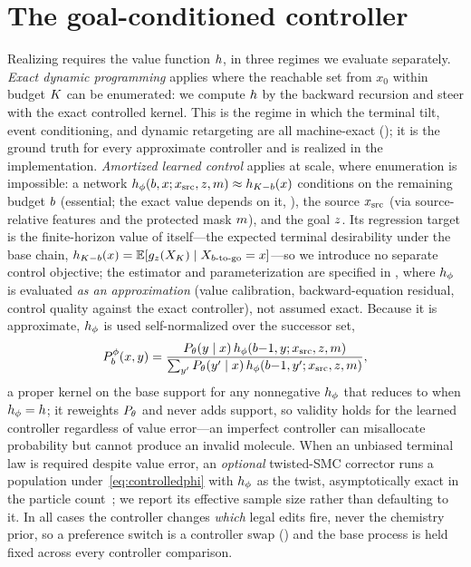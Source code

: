 \section{The goal-conditioned controller}
\label{sec:controller}

Realizing  requires the value function $h$, in three regimes we evaluate separately.
\emph{Exact dynamic programming} applies where the reachable set from $x_0$ within budget $K$ can
be enumerated: we compute $h$ by the backward recursion and steer with the exact controlled kernel.
This is the regime in which the terminal tilt, event conditioning, and dynamic retargeting are all
machine-exact (); it is the ground truth for every approximate controller and is
realized in the implementation. \emph{Amortized learned control} applies at scale, where enumeration is
impossible: a network $h_\phi(b,x;x_{\mathrm{src}},z,m)\approx h_{K-b}(x)$
conditions on the remaining budget $b$ (essential; the exact value depends on it,
), the source $x_{\mathrm{src}}$ (via source-relative features and the protected mask $m$),
and the goal $z$. Its regression target is the finite-horizon value of  itself---the
expected terminal desirability under the base chain,
$h_{K-b}(x)=\mathbb{E}[g_z(X_K)\mid X_{b\text{-to-go}}=x]$---so we
introduce no separate control objective; the estimator and parameterization are specified in
, where $h_\phi$ is evaluated \emph{as an approximation} (value calibration,
backward-equation residual, control quality against the exact controller), not assumed exact. Because it
is approximate, $h_\phi$ is used self-normalized over the successor set,
\begin{equation}
P^{\phi}_{b}(x,y)=\frac{P_\theta(y\mid x)\,h_\phi(b{-}1,y;x_{\mathrm{src}},z,m)}
{\sum_{y'}P_\theta(y'\mid x)\,h_\phi(b{-}1,y';x_{\mathrm{src}},z,m)},
\label{eq:controlledphi}
\end{equation}
a proper kernel on the base support for any nonnegative $h_\phi$ that reduces to  when
$h_\phi=h$; it reweights $P_\theta$ and never adds support, so validity holds for the learned
controller regardless of value error---an imperfect controller can misallocate probability but cannot
produce an invalid molecule. When an unbiased terminal law is required despite value error, an
\emph{optional} twisted-SMC corrector runs a population under~\eqref{eq:controlledphi} with $h_\phi$
as the twist, asymptotically exact in the particle count~\citep{wu2023twisted,skreta2025feynman}; we
report its effective sample size rather than defaulting to it. In all cases the controller changes
\emph{which} legal edits fire, never the chemistry prior, so a preference switch is a controller swap
() and the base process is held fixed across every controller comparison.
